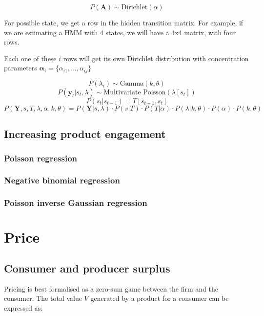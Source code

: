\documentclass{article}
\begin{document}
\[
P(\mathbf{A}) \sim \text{Dirichlet}(\alpha)
 \]

For possible state, we get a row in the hidden transition matrix. For example, if we are estimating a HMM with 4 states, we will have a 4x4 matrix, with four rows.

Each one of these $i$ rows will get its own Dirichlet distribution with concentration parameters $\boldsymbol{\alpha}_i = \{\alpha_{i1}, ..., \alpha_{ij}\}$




\]
\[
P(\lambda_i) \sim \text{Gamma}(k, \theta)
\]
\[
P(\mathbf{y}_t | s_t, \lambda) \sim \text{Multivariate Poisson}(\lambda[s_t])
\]
\[
P(s_t | s_{t-1}) = T[s_{t-1}, s_t]
\]
\[
P(\mathbf{Y}, s, T, \lambda, \alpha, k, \theta) = P(\mathbf{Y} | s, \lambda) \cdot P(s | T) \cdot P(T | \alpha) \cdot P(\lambda | k, \theta) \cdot P(\alpha) \cdot P(k, \theta)
\]






\subsection{Increasing product engagement}

\subsubsection{Poisson regression}

\subsubsection{Negative binomial regression}

\subsubsection{Poisson inverse Gaussian regression}








\section{Price}

\subsection{Consumer and producer surplus} 
Pricing is best formalised as a zero-sum game between the firm and the consumer. The total value \( V \) generated by a product for a consumer can be expressed as:
\end{document}
